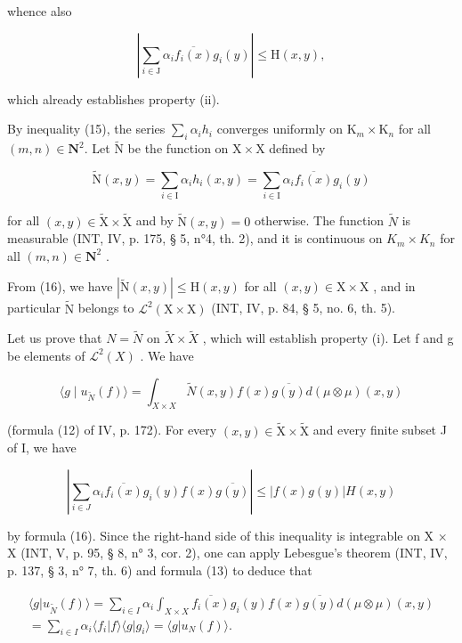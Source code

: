 whence also

\[
\left| \sum_ {i \in \mathrm{J}} \alpha_ {i} \overline {{f _ {i} (x)}} g _ {i} (y) \right| \leqslant \mathrm{H} (x, y),\tag{16}
\]

which already establishes property (ii).

By inequality (15), the series \(\sum_{i} \alpha_{i} h_{i}\) converges uniformly on \(\mathrm{K}_{m} \times \mathrm{K}_{n}\) for all \((m, n) \in \mathbf{N}^{2}\). Let \(\widetilde{\mathrm{N}}\) be the function on \(\mathrm{X} \times \mathrm{X}\) defined by

\[
\widetilde {\mathrm{N}} (x, y) = \sum_ {i \in \mathrm{I}} \alpha_ {i} h _ {i} (x, y) = \sum_ {i \in \mathrm{I}} \alpha_ {i} \overline {{f _ {i} (x)}} g _ {i} (y)
\]

for all \((x,y)\in\widetilde{\mathrm{X}}\times\widetilde{\mathrm{X}}\) and by \(\widetilde{\mathrm{N}}(x,y)=0\) otherwise. The function \(\widetilde{N}\) is measurable (INT, IV, p. 175, § 5, n°4, th. 2), and it is continuous on \(K_{m}\times K_{n}\) for all \((m,n)\in\mathbf{N}^{2}\) .

From (16), we have \(|\widetilde{\mathrm{N}}(x,y)| \leqslant \mathrm{H}(x,y)\) for all \((x,y) \in \mathrm{X} \times \mathrm{X}\) , and in particular \(\widetilde{\mathrm{N}}\) belongs to \(\mathcal{L}^2(\mathrm{X} \times \mathrm{X})\) (INT, IV, p. 84, § 5, no. 6, th. 5).

Let us prove that \(N = \widetilde{N}\) on \(\widetilde{X} \times \widetilde{X}\) , which will establish property (i). Let f and g be elements of \(\mathcal{L}^{2}(X)\) . We have

\[
\langle g \mid u _ {\widetilde {N}} (f) \rangle = \int_ {X \times X} \widetilde {N} (x, y) f (x) \overline {{g (y)}} d (\mu \otimes \mu) (x, y)
\]

(formula (12) of IV, p. 172). For every \((x,y)\in \widetilde{\mathrm{X}}\times \widetilde{\mathrm{X}}\) and every finite subset J of I, we have

\[
\left| \sum_ {i \in J} \alpha_ {i} \overline {{f _ {i} (x)}} g _ {i} (y) f (x) \overline {{g (y)}} \right| \leqslant | f (x) g (y) | H (x, y)
\]

by formula (16). Since the right-hand side of this inequality is integrable on X × X (INT, V, p. 95, § 8, n° 3, cor. 2), one can apply Lebesgue's theorem (INT, IV, p. 137, § 3, n° 7, th. 6) and formula (13) to deduce that

\[
\begin{array}{c} \langle g | u _ {\widetilde {N}} (f) \rangle = \sum_ {i \in I} \alpha_ {i} \int_ {X \times X} \overline {{f _ {i} (x)}} g _ {i} (y) f (x) \overline {{g (y)}} d (\mu \otimes \mu) (x, y) \\ = \sum_ {i \in I} \alpha_ {i} \langle f _ {i} | f \rangle \langle g | g _ {i} \rangle = \langle g | u _ {N} (f) \rangle . \end{array}
\]

